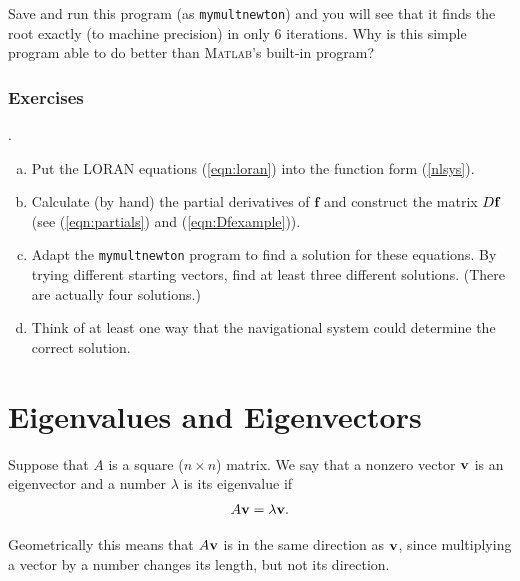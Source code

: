 Save and run this program (as \verb&mymultnewton&) and you will see that it
finds the root exactly (to machine precision)
in only 6 iterations. Why is this simple program able to do better
than \textsc{Matlab}'s built-in program?


\subsection*{Exercises}
\begin{list}
{.}{}

\item 
  \begin{enumerate}[(a)]
  \item Put the LORAN equations (\ref{eqn:loran}) into the
    function form (\ref{nlsys}).
  \item  Calculate (by hand) the partial derivatives of $\mathbf{f}$
  and construct the matrix $D\mathbf{f}$  (see (\ref{eqn:partials}) and (\ref{eqn:Dfexample})).
  \item Adapt the \verb&mymultnewton& program to find a solution
    for these equations.  By trying different starting vectors, find
    at least three different solutions. (There are actually four
    solutions.)  
   \item Think of at least one way that the navigational
    system could determine the correct solution.
  \end{enumerate}

\end{list}








\chapter{Eigenvalues and Eigenvectors}

Suppose that $A$ is a square ($n \times n$) matrix.
We say that a  nonzero vector $\mathbf{v}$ is an eigenvector
and a number $\lambda$ is its eigenvalue if
\begin{equation}\label{def:eig}
   A \mathbf{v} = \lambda \mathbf{v}.
\end{equation}

Geometrically this means that $A\mathbf{v}$ is in the same direction
as $\mathbf{v}$, since multiplying a vector by a number changes
its length, but not its direction.\\

